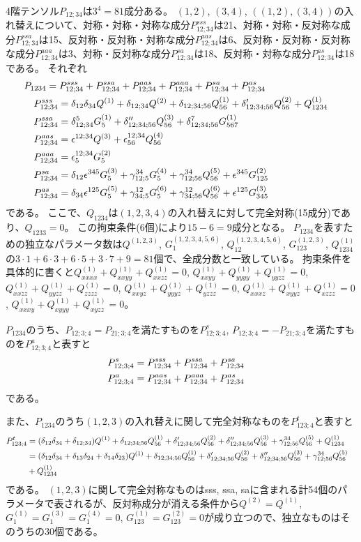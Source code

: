 \documentclass[11pt]{easymemo}
\begin{document}
4階テンソル$P_{12;34}$は$3^4=81$成分ある。
$(1,2)$, $(3,4)$, $((1,2),(3,4))$の入れ替えについて、対称・対称・対称な成分$P_{12;34}^{sss}$は21、対称・対称・反対称な成分$P_{12;34}^{ssa}$は15、反対称・反対称・対称な成分$P_{12;34}^{aas}$は6、反対称・反対称・反対称な成分$P_{12;34}^{aaa}$は3、対称・反対称な成分$P_{12;34}^{sa}$は18、反対称・対称な成分$P_{12;34}^{as}$は18である。
それぞれ
\begin{align}
&
P_{1234}=P^{sss}_{12;34}+P^{ssa}_{12;34}+P^{aas}_{12;34}+P^{aaa}_{12;34}+P^{sa}_{12;34}+P^{as}_{12;34}
\cr&\quad
P^{sss}_{12;34}=\delta_{12}\delta_{34}Q^{(1)}+\delta_{12;34}Q^{(2)}
+\delta_{12;34;56}Q_{56}^{(1)}+\delta_{12;34;56}'Q_{56}^{(2)}
+Q_{1234}^{(1)}
\cr&\quad
P^{ssa}_{12;34}=\delta_{12;34}^5G_5^{(1)}+\delta_{12;34;56}''Q_{56}^{(3)}+\delta_{12;34;56}^7G_{567}^{(1)}
\cr&\quad
P^{aas}_{12;34}=\epsilon^{12;34}Q^{(3)}+\epsilon_{56}^{12;34}Q_{56}^{(4)}
\cr&\quad
P^{aaa}_{12;34}=\epsilon_5^{12;34}G_5^{(2)}
\cr&\quad
P^{sa}_{12;34}=\delta_{12}\epsilon^{345}G_5^{(3)}+\gamma_{12;5}^{34}G_5^{(4)}+\gamma_{12;56}^{34}Q_{56}^{(5)}+\epsilon^{345}G_{125}^{(2)}
\cr&\quad
P^{as}_{12;34}=\delta_{34}\epsilon^{125}G_5^{(5)}+\gamma_{34;5}^{12}G_5^{(6)}+\gamma_{34;56}^{12}Q_{56}^{(6)}+\epsilon^{125}G_{345}^{(3)}
\label{decomp4}
\end{align}
である。
ここで、$Q_{1234}$は$(1,2,3,4)$の入れ替えに対して完全対称(15成分)であり、$Q_{1233}=0$。
この拘束条件(6個)により$15-6=9$成分となる。
$P_{1234}$を表すための独立なパラメータ数は$Q^{(1,2,3)}$, $G_1^{(1,2,3,4,5,6)}$, $Q_{12}^{(1,2,3,4,5,6)}$, $G_{123}^{(1,2,3)}$, $Q_{1234}^{(1)}$の$3\cdot1+6\cdot 3+6\cdot 5+3\cdot7+9=81$個で、全成分数と一致している。
拘束条件を具体的に書くと$Q_{xxxx}^{(1)}+Q_{xxyy}^{(1)}+Q_{xxzz}^{(1)}=0$, $Q_{xxyy}^{(1)}+Q_{yyyy}^{(1)}+Q_{yyzz}^{(1)}=0$, $Q_{xxzz}^{(1)}+Q_{yyzz}^{(1)}+Q_{zzzz}^{(1)}=0$, $Q_{xxyz}^{(1)}+Q_{yyyz}^{(1)}+Q_{yzzz}^{(1)}=0$, $Q_{xxxz}^{(1)}+Q_{xyyz}^{(1)}+Q_{xzzz}^{(1)}=0$, $Q_{xxxy}^{(1)}+Q_{xyyy}^{(1)}+Q_{xyzz}^{(1)}=0$。


$P_{1234}$のうち、$P_{12;3;4}=P_{21;3;4}$を満たすものを$P_{12;3;4}^{s}$, $P_{12;3;4}=-P_{21;3;4}$を満たすものを$P_{12;3;4}^{a}$と表すと
\begin{align}
&
P_{12;3;4}^{s}=P_{12;34}^{sss}+P_{12;34}^{ssa}+P_{12;34}^{sa}
\cr&
P_{12;3;4}^{a}=P_{12;34}^{aas}+P_{12;34}^{aaa}+P_{12;34}^{as}
\end{align}
である。

また、$P_{1234}$のうち$(1,2,3)$の入れ替えに関して完全対称なものを$P_{123;4}^t$と表すと
\begin{align}
P_{123;4}^t&
=(\delta_{12}\delta_{34}+\delta_{12;34})Q^{(1)}
+\delta_{12;34;56}Q_{56}^{(1)}+\delta_{12;34;56}'Q_{56}^{(2)}+\delta_{12;34;56}''Q_{56}^{(3)}+\gamma_{12;56}^{34}Q_{56}^{(5)}
+Q_{1234}^{(1)}
\cr&
=(\delta_{12}\delta_{34}+\delta_{13}\delta_{24}+\delta_{14}\delta_{23})Q^{(1)}
+\delta_{12;34;56}Q_{56}^{(1)}+\delta_{12;34;56}'Q_{56}^{(2)}+\delta_{12;34;56}''Q_{56}^{(3)}+\gamma_{12;56}^{34}Q_{56}^{(5)}
\cr&
+Q_{1234}^{(1)}
\end{align}
である。
$(1,2,3)$に関して完全対称なものはsss, ssa, saに含まれる計54個のパラメータで表されるが、反対称成分が消える条件から$Q^{(2)}=Q^{(1)}$, $G_1^{(1)}=G_1^{(3)}=G_1^{(4)}=0$, $G_{123}^{(1)}=G_{123}^{(2)}=0$が成り立つので、独立なものはそのうちの30個である。
\end{document}
